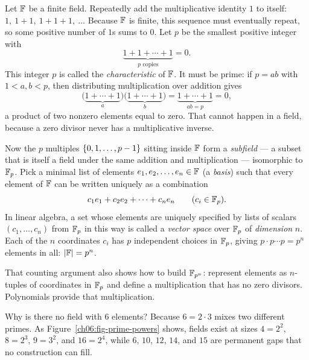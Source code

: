 \begin{whybox}
Let $\mathbb{F}$ be a finite field. Repeatedly add the multiplicative identity $1$ to
itself: $1,\ 1+1,\ 1+1+1,\ \dots$ Because $\mathbb{F}$ is finite, this sequence must
eventually repeat, so some positive number of $1$s sums to $0$. Let $p$ be the
smallest positive integer with
\[
\underbrace{1 + 1 + \cdots + 1}_{p\text{ copies}} = 0.
\]
This integer $p$ is called the \emph{characteristic} of $\mathbb{F}$. It must be prime:
if $p = ab$ with $1 < a,b < p$, then distributing multiplication over addition
gives
\[
\bigl(\underbrace{1 + \cdots + 1}_{a}\bigr)
\bigl(\underbrace{1 + \cdots + 1}_{b}\bigr)
= \underbrace{1 + \cdots + 1}_{ab = p} = 0,
\]
a product of two nonzero elements equal to zero. That cannot happen in a field,
because a zero divisor never has a multiplicative inverse.

Now the $p$ multiples $\{0,1,\dots,p-1\}$ sitting inside $\mathbb{F}$ form a
\emph{subfield} --- a subset that is itself a field under the same addition and
multiplication --- isomorphic to $\mathbb{F}_p$. Pick a minimal list of elements
$e_1, e_2, \dots, e_n \in \mathbb{F}$ (a \emph{basis}) such that every element of $\mathbb{F}$
can be written uniquely as a combination
\[
c_1 e_1 + c_2 e_2 + \cdots + c_n e_n \qquad (c_i \in \mathbb{F}_p).
\]
In linear algebra, a set whose elements are uniquely specified by lists of
scalars $(c_1,\dots,c_n)$ from $\mathbb{F}_p$ in this way is called a \emph{vector
space} over $\mathbb{F}_p$ of \emph{dimension} $n$. Each of the $n$ coordinates $c_i$
has $p$ independent choices in $\mathbb{F}_p$, giving $p \cdot p \cdots p = p^n$
elements in all: $\lvert\mathbb{F}\rvert = p^n$.
\end{whybox}

That counting argument also shows how to build $\mathbb{F}_{p^n}$: represent elements
as $n$-tuples of coordinates in $\mathbb{F}_p$ and define a multiplication that has no
zero divisors. Polynomials provide that multiplication.

\begin{intuitionbox}
Why is there no field with $6$ elements? Because $6 = 2\cdot 3$ mixes two
different primes. As Figure~\ref{ch06:fig-prime-powers} shows, fields exist at
sizes $4=2^2$, $8=2^3$, $9=3^2$, and $16=2^4$, while $6$, $10$, $12$, $14$, and
$15$ are permanent gaps that no construction can fill.
\end{intuitionbox}


